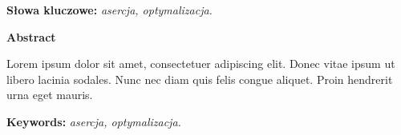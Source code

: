 \documentclass[a4paper,onecolumn,oneside,12pt]{mwrep}
\begin{document}
\vspace*{\baselineskip}

\noindent\textbf{Słowa kluczowe:} \textit{asercja, optymalizacja.}

\vspace*{2\baselineskip}

\begin{center}
\textbf{Abstract}
\end{center}

Lorem ipsum dolor sit amet, consectetuer adipiscing elit. Donec vitae ipsum ut
libero lacinia sodales. Nunc nec diam quis felis congue aliquet. Proin hendrerit
urna eget mauris.

\vspace*{\baselineskip}

\noindent\textbf{Keywords:} \textit{asercja, optymalizacja.}

\setcounter{page}{2}

\tableofcontents




\nocite{*}

\end{document}
